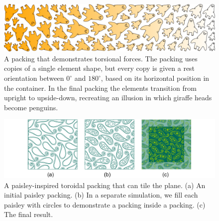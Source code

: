 \begin{figure}
\centering
\includegraphics[width=1.0\textwidth]{figures/repulsionpak/giraffe_penguin.pdf}
\caption[A packing that demonstrates torsional forces]
{\label{giraffe_penguin_packing}
A packing that demonstrates torsional forces.
The packing uses copies of a single element shape, but every copy is given a rest orientation between $0^\circ$
and $180^\circ$, based on its horizontal position in the container.  In the final packing the elements transition
from upright to upside-down, recreating an illusion in which giraffe heads become penguins.}
\end{figure}

\begin{figure}
\centering
\includegraphics[width=1.0\textwidth]{figures/repulsionpak/paisley_new.pdf} 
\vspace{-10pt}
\caption[A paisley-inspired toroidal packing that can tile the plane]
{\label{paisley_packing}
A paisley-inspired toroidal packing that can tile the plane. 
           (a) An initial paisley packing.
           (b) In a separate simulation, we fill each paisley with circles to demonstrate a packing inside a packing.
           (c) The final result.
}
\end{figure}

